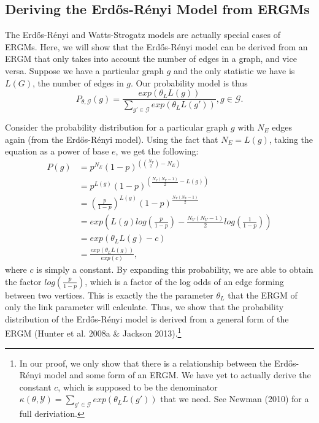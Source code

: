 \documentclass[12pt,twoside]{amherstthesis}
\begin{document}
  \subsection{Deriving the Erdős-Rényi Model from
  ERGMs}\label{deriving-the-erdos-renyi-model-from-ergms}
  
  The Erdős-Rényi and Watts-Strogatz models are actually special cases of
  ERGMs. Here, we will show that the Erdős-Rényi model can be derived from
  an ERGM that only takes into account the number of edges in a graph, and
  vice versa. Suppose we have a particular graph \(g\) and the only
  statistic we have is \(L(G)\), the number of edges in \(g\). Our
  probability model is thus
  \[P_{\theta, \mathcal{G}}(g) = \frac {exp(\theta_{L}L(g))} {\sum_{g' \in \mathcal{G}}^{} exp(\theta_{L}L(g'))}, g \in \mathcal{G}.\]
  
  Consider the probability distribution for a particular graph \(g\) with
  \(N_E\) edges again (from the Erdős-Rényi model). Using the fact that
  \(N_{E} = L(g)\), taking the equation as a power of base \(e\), we get
  the following: \[
  \begin{aligned}
  P(g) &= p^{N_E}(1 - p)^{\left({N_V \choose 2} - N_E \right)} \\
  &= p^{L(g)}(1 - p)^{\left(\frac {N_{V}(N_{V} - 1)} {2} - L(g) \right)} \\
  &= \left( \frac {p} {1-p} \right)^{L(g)}(1 - p)^{\frac {N_{V}(N_{V} - 1)} {2}} \\
  &= exp \left(L(g)log \left(\frac {p} {1-p} \right) - \frac {N_{V}(N_{V} - 1)} {2} log \left(\frac {1} {1 - p} \right) \right) \\
  &= exp(\theta_{L}L(g) - c) \\
  &= \frac {exp(\theta_{L}L(g))} {exp(c)},
  \end{aligned} 
  \] where \(c\) is simply a constant. By expanding this probability, we
  are able to obtain the factor \(log \left( \frac {p} {1 - p} \right)\),
  which is a factor of the log odds of an edge forming between two
  vertices. This is exactly the the parameter \(\theta_{L}\) that the ERGM
  of only the link parameter will calculate. Thus, we show that the
  probability distribution of the Erdős-Rényi model is derived from a
  general form of the ERGM (Hunter et al. 2008a \& Jackson
  2013).\footnote{In our proof, we only show that there is a relationship
    between the Erdős-Rényi model and some form of an ERGM. We have yet to
    actually derive the constant \(c\), which is supposed to be the
    denominator
    \(\kappa(\theta, \mathcal{Y}) = \sum_{g' \in \mathcal{G}}^{} exp(\theta_{L}L(g'))\)
    that we need. See Newman (2010) for a full deriviation.}
  
\end{document}
